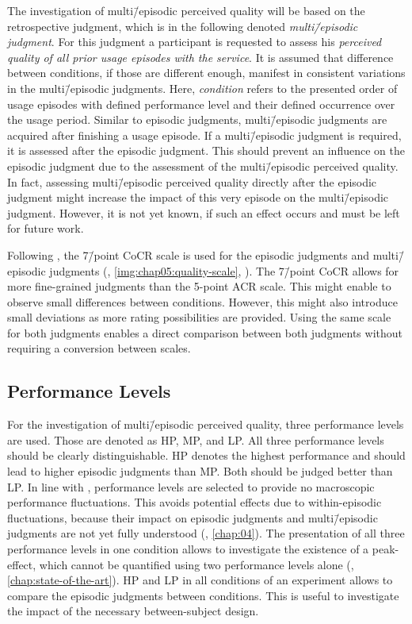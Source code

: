 The investigation of multi\=/episodic perceived quality will be based on the retrospective judgment, which is in the following denoted \emph{multi\=/episodic judgment}.
For this judgment a participant is requested to assess his \emph{perceived quality of all prior usage episodes with the service}.
It is assumed that difference between conditions, if those are different enough, manifest in consistent variations in the multi\=/episodic judgments.
Here, \emph{condition} refers to the presented order of usage episodes with defined performance level and their defined occurrence over the usage period.
Similar to episodic judgments, multi\=/episodic judgments are acquired after finishing a usage episode.
If a multi\=/episodic judgment is required, it is assessed after the episodic judgment.
This should prevent an influence on the episodic judgment due to the assessment of the multi\=/episodic perceived quality.
In fact, assessing multi\=/episodic perceived quality directly after the episodic judgment might increase the impact of this very episode on the multi\=/episodic judgment.
However, it is not yet known, if such an effect occurs and must be left for future work.

Following \citet{moller_single-call_2011}, the 7\=/point \acf{CoCR} scale is used for the episodic judgments and multi\=/episodic judgments (\cf, \autoref{img:chap05:quality-scale}, ).
The 7\=/point \ac{CoCR} allows for more fine-grained judgments than the 5-point \ac{ACR} scale.
This might enable to observe small differences between conditions.
However, this might also introduce small deviations as more rating possibilities are provided.
Using the same scale for both judgments enables a direct comparison between both judgments without requiring a conversion between scales.

\subsection{Performance Levels}
For the investigation of multi\=/episodic perceived quality, three performance levels are used.
Those are denoted as \acf{HP}, \acf{MP}, and \acf{LP}.
All three performance levels should be clearly distinguishable.
\ac{HP} denotes the highest performance and should lead to higher episodic judgments than \ac{MP}.
Both should be judged better than \ac{LP}.
In line with \citet{moller_single-call_2011}, performance levels are selected to provide no macroscopic performance fluctuations.
This avoids potential effects due to within-episodic fluctuations, because their impact on episodic judgments and multi\=/episodic judgments are not yet fully understood (\cf, \autoref{chap:04}).
The presentation of all three performance levels in one condition allows to investigate the existence of a peak-effect, which cannot be quantified using two performance levels alone (\cf, \autoref{chap:state-of-the-art}).
\ac{HP} and \ac{LP} in all conditions of an experiment allows to compare the episodic judgments between conditions.
This is useful to investigate the impact of the necessary between-subject design.

